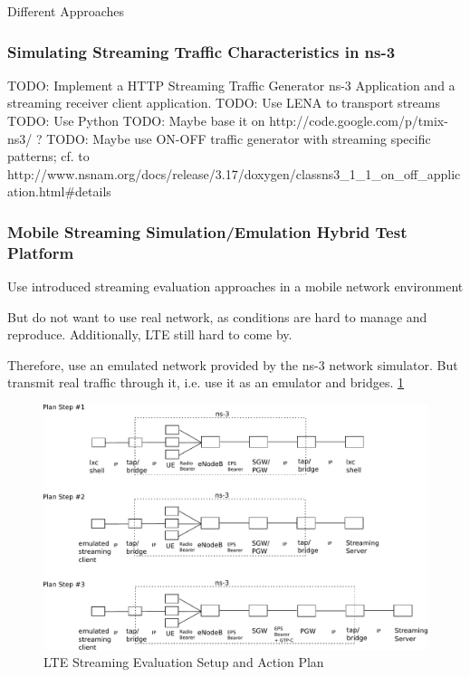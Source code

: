 Different Approaches

\subsubsection{Simulating Streaming Traffic Characteristics in ns-3}

TODO: Implement a HTTP Streaming Traffic Generator ns-3 Application and a streaming receiver client application.
TODO: Use LENA to transport streams
TODO: Use Python
TODO: Maybe base it on http://code.google.com/p/tmix-ns3/ ?
TODO: Maybe use ON-OFF traffic generator with streaming specific patterns; cf. to http://www.nsnam.org/docs/release/3.17/doxygen/classns3\_1\_1\_on\_off\_application.html\#details


\subsubsection{Mobile Streaming Simulation/Emulation Hybrid Test Platform}

Use introduced streaming evaluation approaches in a mobile network environment

But do not want to use real network, as conditions are hard to manage and reproduce. Additionally, LTE still hard to come by.

Therefore, use an emulated network provided by the ns-3 network simulator. But transmit real traffic through it, i.e. use it as an emulator and bridges. \ref{fig:lte-testbed}

\begin{figure}
\centering
\includegraphics[width=\textwidth]{images/lte-testbed.pdf}
\caption{LTE Streaming Evaluation Setup and Action Plan}
\label{fig:lte-testbed}
\end{figure}